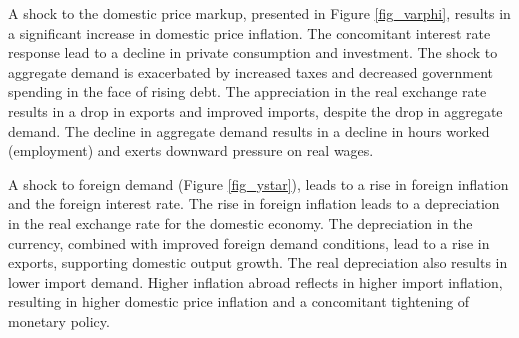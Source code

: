 \documentclass[a4paper,11pt]{article}
\numberwithin{equation}{section}
\begin{document}
	A shock to the domestic price markup, presented in Figure \ref{fig_varphi}, results in a significant increase in domestic price inflation. The concomitant interest rate response lead to a decline in private consumption and investment. The shock to aggregate demand is exacerbated by increased taxes and decreased government spending in the face of rising debt. The appreciation in the real exchange rate results in a drop in exports and improved imports, despite the drop in aggregate demand. The decline in aggregate demand results in a decline in hours worked (employment) and exerts downward pressure on real wages.
	
	A shock to foreign demand (Figure \ref{fig_ystar}), leads to a rise in foreign inflation and the foreign interest rate. The rise in foreign inflation leads to a depreciation in the real exchange rate for the domestic economy. The depreciation in the currency, combined with improved foreign demand conditions, lead to a rise in exports, supporting domestic output growth. The real depreciation also results in lower import demand. Higher inflation abroad reflects in higher import inflation, resulting in higher domestic price inflation and a concomitant tightening of monetary policy.
	
\end{document}
